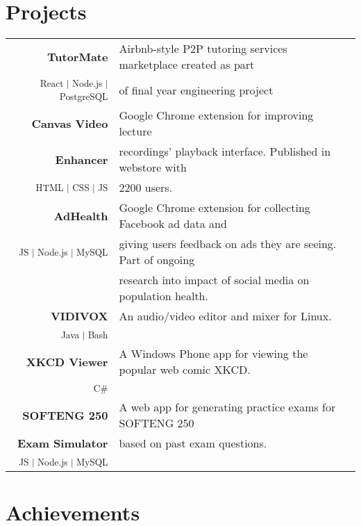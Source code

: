 \documentclass[letterpaper]{deedy-resume} %
\begin{document}
\begin{minipage}[t]{0.655\textwidth}
\section{Projects}
\bgroup
\setlength{\parindent}{-0.5em}
\begin{tabular}{rll}
\textbf{TutorMate} & Airbnb-style P2P tutoring services marketplace created as part\\
\vspace{5pt}
\textsuperscript{React | Node.js | PostgreSQL} & of final year engineering project\\
\textbf{Canvas Video} & Google Chrome extension for improving lecture\\
\textbf{Enhancer} & recordings' playback interface. Published in webstore with\\
\vspace{5pt}
\textsuperscript{HTML | CSS | JS} & 2200 users.\\
\textbf{AdHealth} & Google Chrome extension for collecting Facebook ad data and\\
\textsuperscript{JS | Node.js | MySQL} & giving users feedback on ads they are seeing. Part of ongoing\\
\vspace{5pt}
 & research into impact of social media on population health. \\
\textbf{VIDIVOX} & An audio/video editor and mixer for Linux.\\ 
\vspace{5pt}
\textsuperscript{Java | Bash} \\
\textbf{XKCD Viewer} & A Windows Phone app for viewing the popular web comic XKCD.\\
\vspace{5pt}
\textsuperscript{C\#} \\
\textbf{SOFTENG 250} & A web app for generating practice exams for SOFTENG 250 \\
\textbf{Exam Simulator} & based on past exam questions.\\
\textsuperscript{JS | Node.js | MySQL}

\end{tabular}
\egroup

\sectionspace
\vspace{-0.5em}
\section{Achievements} 


\end{minipage}
\end{document}
